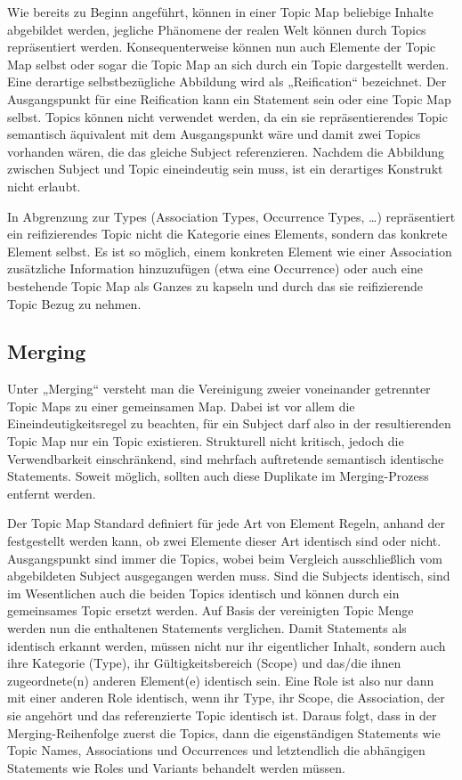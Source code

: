 Wie bereits zu Beginn angeführt, können in einer Topic Map beliebige Inhalte abgebildet werden, jegliche Phänomene der realen Welt können durch Topics repräsentiert werden. Konsequenterweise können nun auch Elemente der Topic Map selbst oder sogar die Topic Map an sich durch ein Topic dargestellt werden. Eine derartige selbstbezügliche Abbildung wird als „Reification“ bezeichnet. Der Ausgangspunkt für eine Reification kann ein Statement sein oder eine Topic Map selbst. Topics können nicht verwendet werden, da ein sie repräsentierendes Topic semantisch äquivalent mit dem Ausgangspunkt wäre und damit zwei Topics vorhanden wären, die das gleiche Subject referenzieren. Nachdem die Abbildung zwischen Subject und Topic eineindeutig sein muss, ist ein derartiges Konstrukt nicht erlaubt.

In Abgrenzung zur Types (Association Types, Occurrence Types, \ldots) repräsentiert ein reifizierendes Topic nicht die Kategorie eines Elements, sondern das konkrete Element selbst. Es ist so möglich, einem konkreten Element wie einer Association zusätzliche Information hinzuzufügen (etwa eine Occurrence) oder auch eine bestehende Topic Map als Ganzes zu kapseln und durch das sie reifizierende Topic Bezug zu nehmen. 


\subsection{Merging} %
\label{ssub:merging}

Unter „Merging“ versteht man die Vereinigung zweier voneinander getrennter Topic Maps zu einer gemeinsamen Map. Dabei ist vor allem die Eineindeutigkeitsregel zu beachten, für ein Subject darf also in der resultierenden Topic Map nur ein Topic existieren. Strukturell nicht kritisch, jedoch die Verwendbarkeit einschränkend, sind mehrfach auftretende semantisch identische Statements. Soweit möglich, sollten auch diese Duplikate im Merging-Prozess entfernt werden.

Der Topic Map Standard definiert für jede Art von Element Regeln, anhand der festgestellt werden kann, ob zwei Elemente dieser Art identisch sind oder nicht. Ausgangspunkt sind immer die Topics, wobei beim Vergleich ausschließlich vom abgebildeten Subject ausgegangen werden muss. Sind die Subjects identisch, sind im Wesentlichen auch die beiden Topics identisch und können durch ein gemeinsames Topic ersetzt werden. Auf Basis der vereinigten Topic Menge werden nun die enthaltenen Statements verglichen. Damit Statements als identisch erkannt werden, müssen nicht nur ihr eigentlicher Inhalt, sondern auch ihre Kategorie (Type), ihr Gültigkeitsbereich (Scope) und das/die ihnen zugeordnete(n) anderen Element(e) identisch sein. Eine Role ist also nur dann mit einer anderen Role identisch, wenn ihr Type, ihr Scope, die Association, der sie angehört und das referenzierte Topic identisch ist. Daraus folgt, dass in der Merging-Reihenfolge zuerst die Topics, dann die eigenständigen Statements wie Topic Names, Associations und Occurrences und letztendlich die abhängigen Statements wie Roles und Variants behandelt werden müssen.

